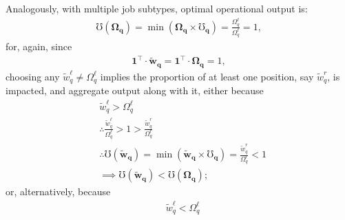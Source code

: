 \documentclass[hidelinks, nonatbib]{elsarticle}
\begin{document}
\begin{enumerate}
    Analogously, with multiple job subtypes, optimal operational output is:
    \begin{gather}
        \mho(\boldsymbol{\Omega_q})
        = 
        \min(
            \boldsymbol{\Omega_q}
            \times
            \boldsymbol{\mho_q}
        )
        =
        \frac{
            \Omega_{q}^{\ell}
        }{
            \Omega_{q}^{\ell}
        }
        =
        1
        ,
    \end{gather}
    for, again, since
    \begin{gather}
        \boldsymbol{1} ^ {\top}
        \cdot
        \boldsymbol{\tilde{w}_{q}}
        =
        \boldsymbol{1} ^ {\top}
        \cdot
        \boldsymbol{\Omega_{q}}
        = 1
        ,
    \end{gather}
    choosing any $\tilde{w}_{q}^{\ell} \neq \Omega_{q}^{\ell}$ implies the proportion of at least one position, say $\tilde{w}_{q}^{r}$, is impacted, and aggregate output along with it, either because
    \begin{align}
        &
        \tilde{w}_{q}^{\ell} > \Omega_{q}^{\ell}
        \\
        &\therefore
        \frac{
            \tilde{w}_{q}^{\ell}
        }{
            \Omega_{q}^{\ell}
        }
        > 
        1
        > 
        \frac{
            \tilde{w}_{q}^{r}
        }{
            \Omega_{q}^{r}
        }
        \\
        &\therefore
        \mho(\boldsymbol{\tilde{w}_q})
        = 
        \min(
            \boldsymbol{\tilde{w}_q}
            \times
            \boldsymbol{\mho_q}
        )
        =
        \frac{
            \tilde{w}_{q}^{r}
        }{
            \Omega_{q}^{r}
        }
        < 
        1
        \\
        &\implies
        \mho(\boldsymbol{\tilde{w}_q})
        <
        \mho(\boldsymbol{\Omega_q})
        ;
    \end{align}
    or, alternatively, because
    \begin{align}
        &
        \tilde{w}_{q}^{\ell} < \Omega_{q}^{\ell}
        \\

\end{align}
\end{enumerate}
\end{document}
